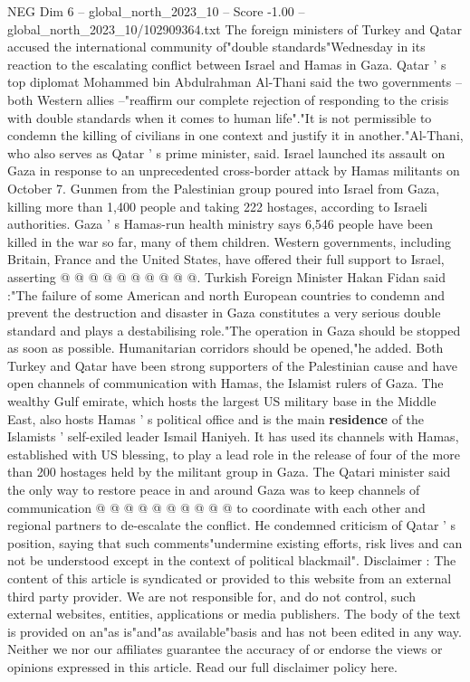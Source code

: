 \begin{textsample}{NEG Dim 6 – global\_north\_2023\_10 – Score -1.00 – global\_north\_2023\_10/102909364.txt}  \label{ex:f6_neg_255}
The foreign ministers of Turkey and Qatar accused the international community of"double standards"Wednesday in its reaction to the escalating conflict between Israel and Hamas in Gaza.
Qatar ' s top diplomat Mohammed bin Abdulrahman Al-Thani said the two governments -- both Western allies --"reaffirm our complete rejection of responding to the crisis with double standards when it comes to human life"."It is not permissible to condemn the killing of civilians in one context and justify it in another."Al-Thani, who also serves as Qatar ' s prime minister, said.
Israel launched its assault on Gaza in response to an unprecedented cross-border attack by Hamas militants on October 7.
Gunmen from the Palestinian group poured into Israel from Gaza, killing more than 1,400 people and taking 222 hostages, according to Israeli authorities.
Gaza ' s Hamas-run health ministry says 6,546 people have been killed in the war so far, many of them children.
Western governments, including Britain, France and the United States, have offered their full support to Israel, asserting @ @ @ @ @ @ @ @ @ @.
Turkish Foreign Minister Hakan Fidan said :"The failure of some American and north European countries to condemn and prevent the destruction and disaster in Gaza constitutes a very serious double standard and plays a destabilising role."The operation in Gaza should be stopped as soon as possible.
Humanitarian corridors should be opened,"he added.
Both Turkey and Qatar have been strong supporters of the Palestinian cause and have open channels of communication with Hamas, the Islamist rulers of Gaza.
The wealthy Gulf emirate, which hosts the largest US military base in the Middle East, also hosts Hamas ' s political office and is the main \textbf{residence} of the Islamists ' self-exiled leader Ismail Haniyeh.
It has used its channels with Hamas, established with US blessing, to play a lead role in the release of four of the more than 200 hostages held by the militant group in Gaza.
The Qatari minister said the only way to restore peace in and around Gaza was to keep channels of communication @ @ @ @ @ @ @ @ @ @ to coordinate with each other and regional partners to de-escalate the conflict.
He condemned criticism of Qatar ' s position, saying that such comments"undermine existing efforts, risk lives and can not be understood except in the context of political blackmail".
Disclaimer : The content of this article is syndicated or provided to this website from an external third party provider.
We are not responsible for, and do not control, such external websites, entities, applications or media publishers.
The body of the text is provided on an"as is"and"as available"basis and has not been edited in any way.
Neither we nor our affiliates guarantee the accuracy of or endorse the views or opinions expressed in this article.
Read our full disclaimer policy here.

\end{textsample}
